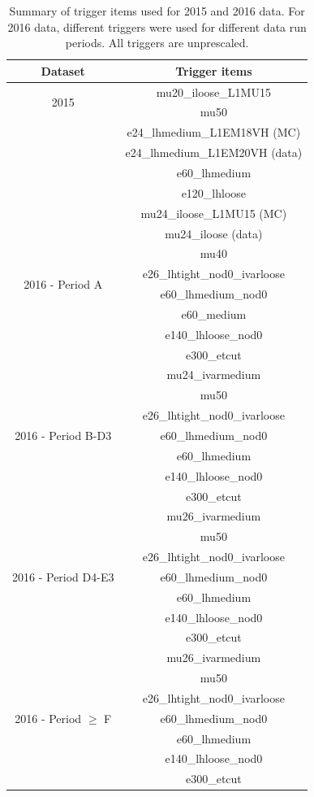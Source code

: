 \begin{table}[htbp!]
\begin{center}
 \begin{tabular}{|c|c|}
  \hline
  Dataset & Trigger items \\
  \hline
  \multirow{2}{*}{2015} & mu20\_iloose\_L1MU15  \\
    & mu50  \\
    & e24\_lhmedium\_L1EM18VH (MC)  \\
    & e24\_lhmedium\_L1EM20VH (data)  \\
    & e60\_lhmedium  \\
    & e120\_lhloose  \\
  \hline
  \multirow{8}{*}{2016 - Period A} & mu24\_iloose\_L1MU15 (MC)  \\
    & mu24\_iloose (data)  \\
    & mu40  \\
    & e26\_lhtight\_nod0\_ivarloose  \\
    & e60\_lhmedium\_nod0  \\
    & e60\_medium  \\
    & e140\_lhloose\_nod0  \\
    & e300\_etcut  \\
  \hline
  \multirow{7}{*}{2016 - Period B-D3} & mu24\_ivarmedium  \\
    & mu50  \\
    & e26\_lhtight\_nod0\_ivarloose  \\
    & e60\_lhmedium\_nod0  \\
    & e60\_lhmedium  \\
    & e140\_lhloose\_nod0  \\
    & e300\_etcut  \\
  \hline
  \multirow{7}{*}{2016 - Period D4-E3} & mu26\_ivarmedium  \\
   & mu50  \\
   & e26\_lhtight\_nod0\_ivarloose  \\
   & e60\_lhmedium\_nod0  \\
   & e60\_lhmedium \\
   & e140\_lhloose\_nod0  \\
   & e300\_etcut  \\
  \hline
  \multirow{7}{*}{2016 - Period $\ge$ F} & mu26\_ivarmedium   \\
   & mu50  \\
   & e26\_lhtight\_nod0\_ivarloose  \\
   & e60\_lhmedium\_nod0  \\
   & e60\_lhmedium  \\
   & e140\_lhloose\_nod0  \\
   & e300\_etcut  \\
  \hline
 \end{tabular}
\end{center}
\caption[List of triggers used]{Summary of trigger items used for 2015 and 2016 data. For 2016 data, different triggers were used for different data run periods. 
All triggers are unprescaled.}
\label{tab:triggers}
\end{table}


